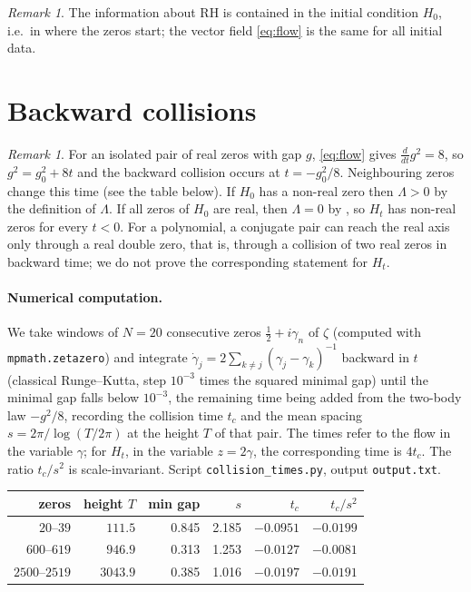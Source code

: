 \documentclass[11pt]{amsart}
\theoremstyle{definition}
\theoremstyle{remark}
\newtheorem{remark}[theorem]{Remark}
\newcommand{\half}{\tfrac12}
\begin{document}
\begin{remark}
The information about RH is contained in the initial condition $H_0$, i.e.\ in where the zeros start;
the vector field \eqref{eq:flow} is the same for all initial data.
\end{remark}

\section{Backward collisions}\label{sec:extremal}

\begin{remark}\label{prop:collision}
For an isolated pair of real zeros with gap $g$, \eqref{eq:flow} gives $\frac{d}{dt}g^2=8$, so
$g^2=g_0^2+8t$ and the backward collision occurs at $t=-g_0^2/8$. Neighbouring zeros change this time (see the
table below). If $H_0$ has a non-real zero then $\Lambda>0$ by the definition of $\Lambda$. If all zeros of $H_0$ are
real, then $\Lambda=0$ by \cite{RT}, so $H_t$ has non-real zeros for every $t<0$. For a polynomial, a conjugate
pair can reach the real axis only through a real double zero, that is, through a collision of two real zeros in
backward time; we do not prove the corresponding statement for $H_t$.
\end{remark}

\paragraph{Numerical computation.} We take windows of $N=20$ consecutive zeros $\half+i\gamma_n$ of $\zeta$
(computed with \texttt{mpmath.zetazero}) and integrate $\dot\gamma_j=2\sum_{k\ne j}(\gamma_j-\gamma_k)^{-1}$
backward in $t$ (classical Runge--Kutta, step $10^{-3}$ times the squared minimal gap) until the minimal gap
falls below $10^{-3}$, the remaining time being added from the two-body law $-g^2/8$, recording the collision time $t_c$ and the mean spacing $s=2\pi/\log(T/2\pi)$ at the height $T$ of
that pair. The times refer to the flow in the variable $\gamma$; for $H_t$, in the variable $z=2\gamma$, the
corresponding time is $4t_c$. The ratio $t_c/s^2$ is scale-invariant. Script \texttt{collision\_times.py},
output \texttt{output.txt}.

\begin{center}
\begin{tabular}{rrrrrr}
\toprule
zeros & height $T$ & min gap & $s$ & $t_c$ & $t_c/s^2$\\
\midrule
$20$--$39$ & $111.5$ & 0.845 & 2.185 & $-0.0951$ & $-0.0199$\\
$600$--$619$ & $946.9$ & 0.313 & 1.253 & $-0.0127$ & $-0.0081$\\
$2500$--$2519$ & $3043.9$ & 0.385 & 1.016 & $-0.0197$ & $-0.0191$\\
\bottomrule
\end{tabular}
\end{center}
\end{document}
